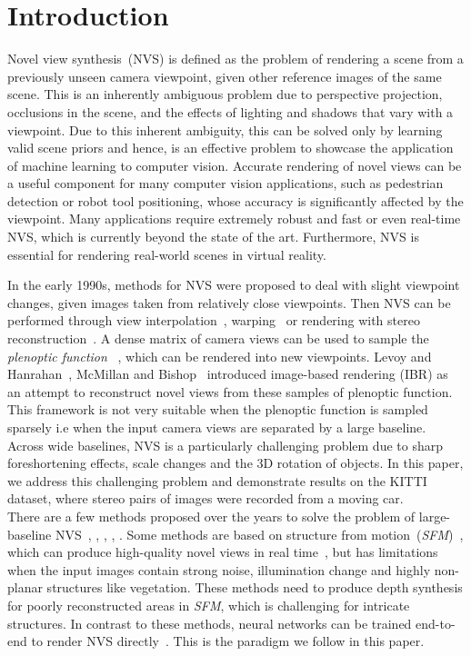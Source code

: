 \documentclass[runningheads]{llncs}
\begin{document}
\section{Introduction}

Novel view synthesis~(NVS) is defined as the problem of rendering a scene from a previously unseen camera viewpoint, given other reference images of the same scene. This is an inherently ambiguous problem due to perspective projection, occlusions in the scene, and the effects of lighting and shadows that vary with a viewpoint. Due to this inherent ambiguity, this can be solved only by learning valid scene priors and hence, is an effective problem to showcase the application of machine learning to computer vision. Accurate rendering of novel views can be a useful component for many computer vision applications, such as pedestrian detection or robot tool positioning, whose accuracy is significantly affected by the viewpoint. Many applications require extremely robust and fast or even real-time NVS, which is currently beyond the state of the art. Furthermore, NVS is essential for rendering real-world scenes in virtual reality.


In the early 1990s, methods for NVS were proposed to deal with slight viewpoint changes, given images taken from relatively close viewpoints. Then NVS can be performed through view interpolation~\cite{chen_and_wiiliams}, warping~\cite{seitz} or rendering with stereo reconstruction~\cite{scharstein1996stereo}. A dense matrix of camera views can be used to sample the \textit{plenoptic function} ~\cite{adelson1991plenoptic}, which can be rendered into new viewpoints. Levoy and Hanrahan~\cite{levoy1996light}, McMillan and Bishop~\cite{mcmillan1995plenoptic} introduced image-based rendering (IBR) as an attempt to reconstruct novel views from these samples of plenoptic function. This framework is not very suitable when the plenoptic function is sampled sparsely i.e when the input camera views are separated by a large baseline. Across wide baselines, NVS is a particularly challenging problem due to sharp foreshortening effects, scale changes and the 3D rotation of objects. In this paper, we address this challenging problem and demonstrate results on the KITTI dataset, where stereo pairs of images were recorded from a moving car.
\newline \\
There are a few methods proposed over the years to solve the problem of large-baseline NVS~\cite{chaurasia2013depth}, \cite{zitnick2004high}, \cite{flynn2015deepstereo}, \cite{goesele2010ambient}, \cite{penner2017soft}. Some methods are based on structure from motion~(\textit{SFM})~\cite{zitnick2004high}, which can produce high-quality novel views in real time~\cite{chaurasia2013depth}, but has limitations when the input images contain strong noise, illumination change and highly non-planar structures like vegetation. These methods need to produce depth synthesis for poorly reconstructed areas in \textit{SFM}, which is challenging for intricate structures. In contrast to these methods, neural networks can be trained end-to-end to render NVS directly~\cite{flynn2015deepstereo}. This is the paradigm we follow in this paper.
\end{document}

